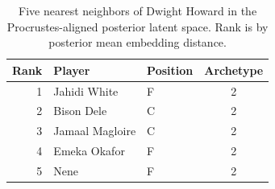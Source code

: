 \begin{table}[htbp]
  \centering\small
  \begin{tabular}{rllc}
    \toprule
    Rank & Player & Position & Archetype \\
    \midrule
    1 & Jahidi White & F & 2 \\
    2 & Bison Dele & C & 2 \\
    3 & Jamaal Magloire & C & 2 \\
    4 & Emeka Okafor & F & 2 \\
    5 & Nene & F & 2 \\
    \bottomrule
  \end{tabular}
  \caption{Five nearest neighbors of Dwight Howard in the Procrustes-aligned posterior latent space. Rank is by posterior mean embedding distance.}
  \label{tab:Dwight_Howard_neighbors}
\end{table}

